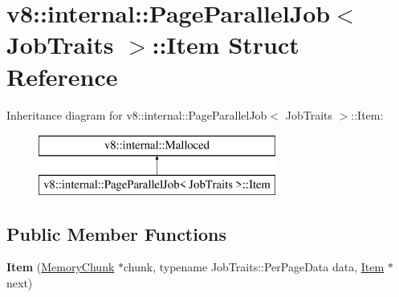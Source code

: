 \hypertarget{structv8_1_1internal_1_1_page_parallel_job_1_1_item}{}\section{v8\+:\+:internal\+:\+:Page\+Parallel\+Job$<$ Job\+Traits $>$\+:\+:Item Struct Reference}
\label{structv8_1_1internal_1_1_page_parallel_job_1_1_item}
Inheritance diagram for v8\+:\+:internal\+:\+:Page\+Parallel\+Job$<$ Job\+Traits $>$\+:\+:Item\+:\begin{figure}[H]
\begin{center}
\leavevmode
\includegraphics[height=2.000000cm]{structv8_1_1internal_1_1_page_parallel_job_1_1_item}
\end{center}
\end{figure}
\subsection*{Public Member Functions}
\begin{DoxyCompactItemize}
\item 
{\bfseries Item} (\hyperlink{classv8_1_1internal_1_1_memory_chunk}{Memory\+Chunk} $\ast$chunk, typename Job\+Traits\+::\+Per\+Page\+Data data, \hyperlink{structv8_1_1internal_1_1_page_parallel_job_1_1_item}{Item} $\ast$next)\hypertarget{structv8_1_1internal_1_1_page_parallel_job_1_1_item_a20b73dab8dc37ab78111bdba083cdd23}{}\label{structv8_1_1internal_1_1_page_parallel_job_1_1_item_a20b73dab8dc37ab78111bdba083cdd23}

\end{DoxyCompactItemize}
